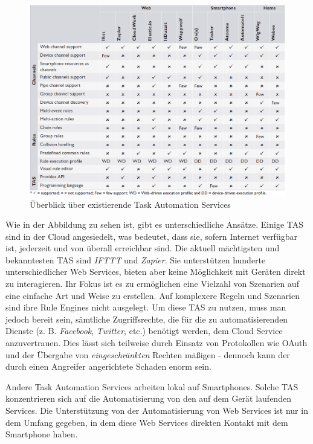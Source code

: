 \begin{figure}[h]
	\centering
	\includegraphics[width=\textwidth]{bilder/TASOverview}
	\caption{Überblick über existierende Task Automation Services \cite{ieee:tas}}
	\label{fig:tasoverview}
\end{figure}

Wie in der Abbildung zu sehen ist, gibt es unterschiedliche Ansätze. Einige TAS sind in der Cloud angesiedelt, was bedeutet, dass sie, sofern Internet verfügbar ist, jederzeit und von überall erreichbar sind. Die aktuell mächtigsten und bekanntesten TAS sind \textit{IFTTT} \cite{IFTTT} und \textit{Zapier}\cite{Zapier}. Sie unterstützen hunderte unterschiedlicher Web Services, bieten aber keine Möglichkeit mit Geräten direkt zu interagieren. Ihr Fokus ist es zu ermöglichen eine Vielzahl von Szenarien auf eine einfache Art und Weise zu erstellen. Auf komplexere Regeln und Szenarien sind ihre Rule Engines nicht ausgelegt. 
Um diese TAS zu nutzen, muss man jedoch bereit sein, sämtliche Zugriffsrechte, die für die zu automatisierenden Dienste (z. B. \textit{Facebook}, \textit{Twitter}, etc.) benötigt werden, dem Cloud Service anzuvertrauen. Dies lässt sich teilweise durch Einsatz von Protokollen wie OAuth und der Übergabe von \textit{eingeschränkten} Rechten mäßigen - dennoch kann der durch einen Angreifer angerichtete Schaden enorm sein.

Andere Task Automation Services arbeiten lokal auf Smartphones. Solche TAS konzentrieren sich auf die Automatisierung von den auf dem Gerät laufenden Services. Die Unterstützung von der Automatisierung von Web Services ist nur in dem Umfang gegeben, in dem diese Web Services direkten Kontakt mit dem Smartphone haben.  

